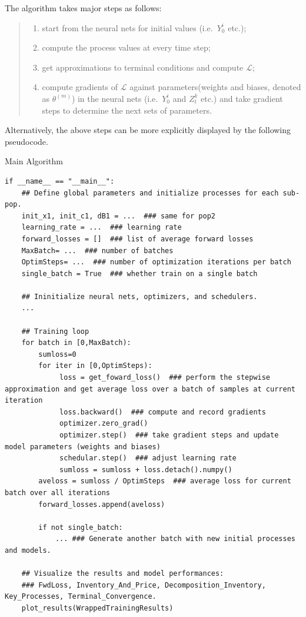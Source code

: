 \documentclass{article}
\begin{document}
The algorithm takes major steps as follows:

\begin{quote}
\begin{enumerate}
\def\labelenumi{\roman{enumi})}
\tightlist
\item
  start from the neural nets for initial values (i.e.~\(Y_0^i\) etc.);
\item
  compute the process values at every time step;
\item
  get approximations to terminal conditions and compute \(\mathcal{L}\);
\item
  compute gradients of \(\mathcal{L}\) against parameters(weights and
  biases, denoted as \(\theta^{(m)}\)) in the neural nets
  (i.e.~\(Y_0^i\) and \(Z_t^k\) etc.) and take gradient steps to
  determine the next sets of parameters.
\end{enumerate}
\end{quote}

Alternatively, the above steps can be more explicitly displayed by the
following pseudocode.


\begin{algorithm}
\caption{Main Algorithm}\label{alg:cap}
\begin{verbatim}
if __name__ == "__main__":
    ## Define global parameters and initialize processes for each sub-pop. 
    init_x1, init_c1, dB1 = ...  ### same for pop2
    learning_rate = ...  ### learning rate
    forward_losses = []  ### list of average forward losses
    MaxBatch= ...  ### number of batches
    OptimSteps= ...  ### number of optimization iterations per batch
    single_batch = True  ### whether train on a single batch 

    ## Ininitialize neural nets, optimizers, and schedulers.
    ...

    ## Training loop
    for batch in [0,MaxBatch):
        sumloss=0
        for iter in [0,OptimSteps):
             loss = get_foward_loss()  ### perform the stepwise approximation and get average loss over a batch of samples at current iteration
             loss.backward()  ### compute and record gradients
             optimizer.zero_grad()  
             optimizer.step()  ### take gradient steps and update model parameters (weights and biases)
             schedular.step()  ### adjust learning rate
             sumloss = sumloss + loss.detach().numpy() 
        aveloss = sumloss / OptimSteps  ### average loss for current batch over all iterations
        forward_losses.append(aveloss)
    
        if not single_batch:
            ... ### Generate another batch with new initial processes and models. 
    
    ## Visualize the results and model performances:
    ### FwdLoss, Inventory_And_Price, Decomposition_Inventory, Key_Processes, Terminal_Convergence.
    plot_results(WrappedTrainingResults)
\end{verbatim}
\end{algorithm}
\end{document}
